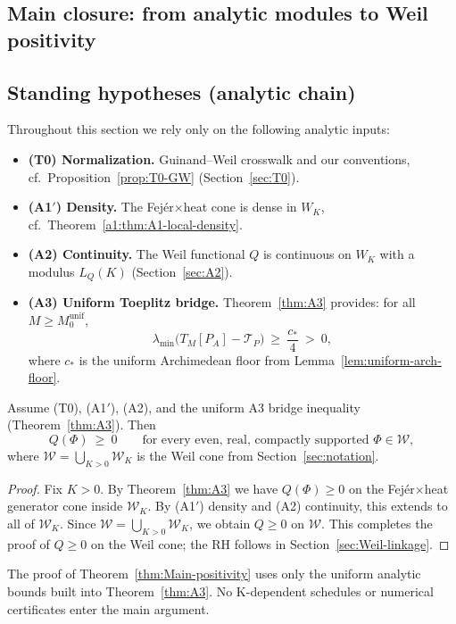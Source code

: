 \subsection{Main closure: from analytic modules to Weil positivity}\label{sec:Main-closure}

\subsection*{Standing hypotheses (analytic chain)}
Throughout this section we rely only on the following analytic inputs:
\begin{itemize}
  \item \textbf{(T0) Normalization.} Guinand--Weil crosswalk and our conventions, cf.\ Proposition~\ref{prop:T0-GW} (Section~\ref{sec:T0}).
  \item \textbf{(A1$'$) Density.} The Fej\'er$\times$heat cone is dense in $W_K$, cf.\ Theorem~\ref{a1:thm:A1-local-density}.
  \item \textbf{(A2) Continuity.} The Weil functional $Q$ is continuous on $W_K$ with a modulus $L_Q(K)$ (Section~\ref{sec:A2}).
  \item \textbf{(A3) Uniform Toeplitz bridge.} Theorem~\ref{thm:A3} provides: for all $M\ge M_0^{\mathrm{unif}}$,
  \[
    \lambda_{\min}\!\big(T_M[P_A]-\mathcal T_P\big)\ \ge\ \frac{c_*}{4}\ >\ 0,
  \]
  where $c_*$ is the uniform Archimedean floor from Lemma~\ref{lem:uniform-arch-floor}.
\end{itemize}

\begin{theorem}\label{thm:Main-positivity}
Assume \textup{(T0)}, \textup{(A1$'$)}, \textup{(A2)}, and the uniform A3 bridge inequality (Theorem~\ref{thm:A3}).
Then
\[
  Q(\Phi)\ \ge\ 0\qquad\text{for every even, real, compactly supported }\Phi\in \mathcal W,
\]
where $\mathcal W=\bigcup_{K>0}\mathcal W_K$ is the Weil cone from Section~\ref{sec:notation}.
\end{theorem}

\begin{proof}
Fix $K>0$. By Theorem~\ref{thm:A3} we have $Q(\Phi)\ge 0$ on the Fej\'er$\times$heat generator cone inside $\mathcal W_K$.
By \textup{(A1$'$)} density and \textup{(A2)} continuity, this extends to all of $\mathcal W_K$.
Since $\mathcal W=\bigcup_{K>0}\mathcal W_K$, we obtain $Q\ge 0$ on $\mathcal W$.
This completes the proof of $Q\ge0$ on the Weil cone; the RH follows in Section~\ref{sec:Weil-linkage}.
\end{proof}

\begin{remark}
The proof of Theorem~\ref{thm:Main-positivity} uses only the uniform analytic bounds built into Theorem~\ref{thm:A3}.
No K-dependent schedules or numerical certificates enter the main argument.
\end{remark}
